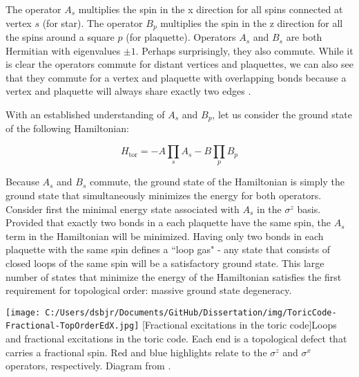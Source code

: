 The operator $A_{s}$ multiplies the spin in the x direction for all spins connected at vertex $s$ (for star). The operator $B_{p}$ multiplies the spin in the z direction for all the spins around a square $p$ (for plaquette). Operators $A_{s}$ and $B_{s}$ are both Hermitian with eigenvalues $\pm 1$. Perhaps surprisingly, they also commute. While it is clear the operators commute for distant vertices and plaquettes, we can also see that they commute for a vertex and plaquette with overlapping bonds because a vertex and plaquette will always share exactly two edges \cite{Kitaev2003}.

With an established understanding of $A_{s}$ and $B_{p}$, let us consider the ground state of the following Hamiltonian:

\begin{equation}
H_{\text{tor}} = -A \prod_{s} A_{s} - B \prod_{p} B_{p}
\end{equation}

Because $A_{s}$ and $B_{s}$ commute, the ground state of the Hamiltonian is simply the ground state that simultaneously minimizes the energy for both operators. Consider first the minimal energy state associated with $A_{s}$ in the $\sigma^{z}$ basis. Provided that exactly two bonds in a each plaquette have the same spin, the $A_{s}$ term in the Hamiltonian will be minimized. Having only two bonds in each plaquette with the same spin defines a ``loop gas" - any state that consists of closed loops of the same spin will be a satisfactory ground state. This large number of states that minimize the energy of the Hamiltonian satisfies the first requirement for topological order: massive ground state degeneracy.

\begin{centering}
\texttt{[image: C:/Users/dsbjr/Documents/GitHub/Dissertation/img/ToricCode-Fractional-TopOrderEdX.jpg]}
  \captionsetup{width=0.75\textwidth}
  [Fractional excitations in the toric code]{Loops and fractional excitations in the toric code. Each end is a topological defect that carries a fractional spin. Red and blue highlights relate to the $\sigma^{z}$ and $\sigma^{x}$ operators, respectively. Diagram from \cite{topOrderEdX}.}
  \label{fig:toricCode2}
\end{centering}

